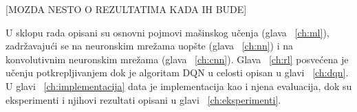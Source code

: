 [MOZDA NESTO O REZULTATIMA KADA IH BUDE]


U sklopu rada opisani su osnovni pojmovi mašinskog učenja (glava ~\ref{ch:ml}), zadržavajući se na neuronskim mrežama uopšte (glava ~\ref{ch:nn}) i na konvolutivnim neuronskim mrežama (glava ~\ref{ch:cnn}). Glava ~\ref{ch:rl} posvećena je učenju potkrepljivanjem dok je algoritam DQN u celosti opisan u glavi ~\ref{ch:dqn}. U glavi ~\ref{ch:implementacija} data je implementacija kao i njena evaluacija, dok su eksperimenti i njihovi rezultati opisani u glavi ~\ref{ch:eksperimenti}. 